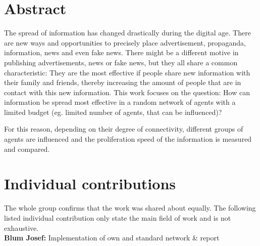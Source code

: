 \documentclass[11pt]{article}
\begin{document}
\newpage







\tableofcontents

\newpage




\section{Abstract}

The spread of information has changed drastically during the digital age. There are new ways and opportunities to precisely place advertisement, propaganda, information, news and even fake news. There might be a different motive in publishing advertisements, news or fake news, but they all share a common characteristic: They are the most effective if people share new information with their family and friends, thereby increasing the amount of people that are in contact with this new information. This work focuses on the question: 
How can information be spread most effective in a random network of agents with a limited budget (eg. limited number of agents, that can be influenced)?

For this reason, depending on their degree of connectivity, different groups of agents are influenced and the proliferation speed of the information is measured and compared. 


\section{Individual contributions}

The whole group confirms that the work was shared about equally. The following listed individual contribution only state the main field of work and is not exhaustive.
\\

\textbf{Blum Josef:} Implementation of own and standard network \& report
\\
\end{document}
